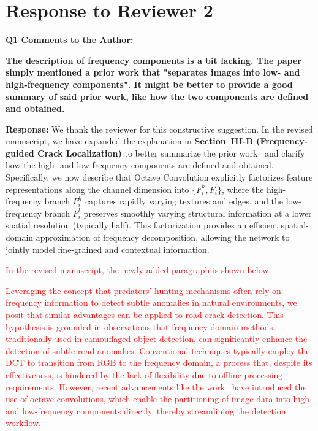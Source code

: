 \documentclass[lettersize,journal,onecolumn,12pt]{IEEEtran}
\begin{document}
\section{Response to Reviewer 2}


{\color{BlueGreen} \textbf{Q1 Comments to the Author:}

\textbf{The description of frequency components is a bit lacking. The paper simply mentioned a prior work that "separates images into low- and high-frequency components". It might be better to provide a good summary of said prior work, like how the two components are defined and obtained.}} 

\textbf{Response:}
We thank the reviewer for this constructive suggestion. 
In the revised manuscript, we have expanded the explanation in \textbf{Section~III-B (Frequency-guided Crack Localization)} to better summarize the prior work~\cite{DBLP:conf/iccv/Chen0XYKRYF19} and clarify how the high- and low-frequency components are defined and obtained. 
Specifically, we now describe that Octave Convolution explicitly factorizes feature representations along the channel dimension into $\{F_i^h, F_i^l\}$, 
where the high-frequency branch $F_i^h$ captures rapidly varying textures and edges, 
and the low-frequency branch $F_i^l$ preserves smoothly varying structural information at a lower spatial resolution (typically half). 
This factorization provides an efficient spatial-domain approximation of frequency decomposition, 
allowing the network to jointly model fine-grained and contextual information. 

\textcolor{red}{In the revised manuscript, the newly added paragraph is shown below:}

\textcolor{red}{Leveraging the concept that predators' hunting mechanisms often rely on frequency information to detect subtle anomalies in natural environments, we posit that similar advantages can be applied to road crack detection. This hypothesis is grounded in observations that frequency domain methods, traditionally used in camouflaged object detection, can significantly enhance the detection of subtle road anomalies. Conventional techniques typically employ the DCT to transition from RGB to the frequency domain, a process that, despite its effectiveness, is hindered by the lack of flexibility due to offline processing requirements. However, recent advancements like the work~\cite{DBLP:conf/iccv/Chen0XYKRYF19} have introduced the use of octave convolutions, which enable the partitioning of image data into high and low-frequency components directly, thereby streamlining the detection workflow. }
\end{document}

